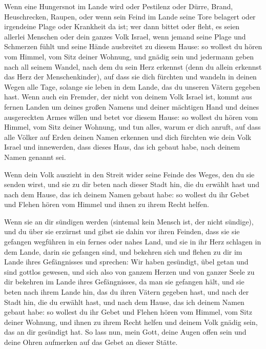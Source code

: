  Wenn eine Hungersnot im Lande wird oder Pestilenz oder
Dürre, Brand, Heuschrecken, Raupen, oder wenn sein Feind im Lande seine
Tore belagert oder irgendeine Plage oder Krankheit da ist;
 wer dann bittet oder fleht, es seien allerlei Menschen
oder dein ganzes Volk Israel, wenn jemand seine Plage und Schmerzen
fühlt und seine Hände ausbreitet zu diesem Hause:  so
wollest du hören vom Himmel, vom Sitz deiner Wohnung, und gnädig sein
und jedermann geben nach all seinem Wandel, nach dem du sein Herz
erkennst (denn du allein erkennst das Herz der Menschenkinder),
 auf dass sie dich fürchten und wandeln in deinen Wegen
alle Tage, solange sie leben in dem Lande, das du unseren Vätern gegeben
hast.  Wenn auch ein Fremder, der nicht von deinem Volk
Israel ist, kommt aus fernen Landen um deines großen Namens und deiner
mächtigen Hand und deines ausgereckten Armes willen und betet vor diesem
Hause:  so wollest du hören vom Himmel, vom Sitz deiner
Wohnung, und tun alles, warum er dich anruft, auf dass alle Völker auf
Erden deinen Namen erkennen und dich fürchten wie dein Volk Israel und
innewerden, dass dieses Haus, das ich gebaut habe, nach deinem Namen
genannt sei.

 Wenn dein Volk auszieht in den Streit wider seine Feinde
des Weges, den du sie senden wirst, und sie zu dir beten nach dieser
Stadt hin, die du erwählt hast und nach dem Hause, das ich deinem Namen
gebaut habe:  so wollest du ihr Gebet und Flehen hören
vom Himmel und ihnen zu ihrem Recht helfen.

 Wenn sie an dir sündigen werden (sintemal kein Mensch
ist, der nicht sündige), und du über sie erzürnst und gibst sie dahin
vor ihren Feinden, dass sie sie gefangen wegführen in ein fernes oder
nahes Land,  und sie in ihr Herz schlagen in dem Lande,
darin sie gefangen sind, und bekehren sich und flehen zu dir im Lande
ihres Gefängnisses und sprechen: Wir haben gesündigt, übel getan und
sind gottlos gewesen,  und sich also von ganzem Herzen
und von ganzer Seele zu dir bekehren im Lande ihres Gefängnisses, da man
sie gefangen hält, und sie beten nach ihrem Lande hin, das du ihren
Vätern gegeben hast, und nach der Stadt hin, die du erwählt hast, und
nach dem Hause, das ich deinem Namen gebaut habe:  so
wollest du ihr Gebet und Flehen hören vom Himmel, vom Sitz deiner
Wohnung, und ihnen zu ihrem Recht helfen und deinem Volk gnädig sein,
das an dir gesündigt hat.  So lass nun, mein Gott, deine
Augen offen sein und deine Ohren aufmerken auf das Gebet an dieser
Stätte.

